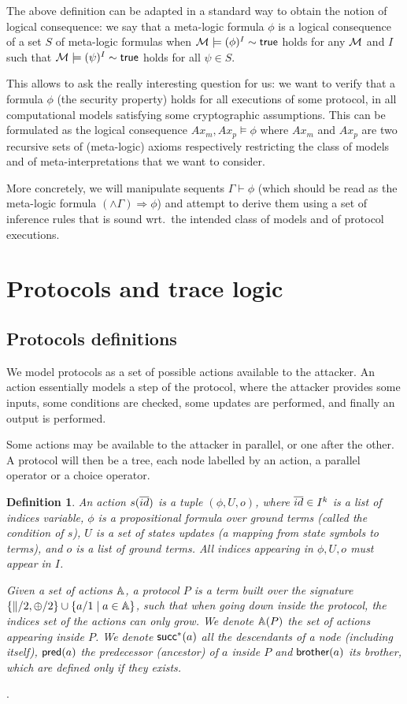 \documentclass[a4paper]{article}
\newtheorem{definition}{Definition}
\theoremstyle{remark}
\begin{document}
The above definition can be adapted in a standard way to obtain the
notion of logical consequence: we say that a meta-logic formula $\phi$ is a
logical consequence of a set $S$ of meta-logic formulas when
$\mathcal{M}\models(\phi)^I\sim\mathsf{true}$ holds for any $\mathcal{M}$ and $I$ such that
$\mathcal{M}\models(\psi)^I\sim\mathsf{true}$ holds for all $\psi\in S$.

This allows to ask the really interesting question for us:
we want to verify that a formula $\phi$ (the security property)
holds for all executions of some protocol, in all computational models
satisfying some cryptographic assumptions.
This can be formulated as the logical consequence $Ax_m,Ax_p\models\phi$
where $Ax_m$ and $Ax_p$ are two recursive sets of (meta-logic) axioms
respectively restricting the class of models and of meta-interpretations
that we want to consider.

More concretely, we will manipulate sequents $\Gamma \vdash \phi$
(which should be read as the meta-logic formula
$(\wedge\Gamma) \Rightarrow \phi$) and attempt to derive them using
a set of inference rules that is sound wrt.\ the intended class
of models and of protocol executions.

\section{Protocols and trace logic}

\subsection{Protocols definitions}
We  model protocols as a set of possible actions available to the
attacker. An action essentially models a step of the protocol, where
the attacker provides some inputs, some conditions are checked, some
updates are performed, and finally an output is performed.

Some actions may be available to the attacker in parallel, or one
after the other. A protocol will then be a tree, each node labelled by an action, a parallel operator or a choice operator.

\begin{definition}
An action $s(\overline{id})$ is a tuple $(\phi,U,o)$, where $\overline{id} \in I^k$ is a list of indices variable, $\phi$ is a propositional formula over ground terms (called the condition of $s$), $U$ is a set of states updates (a mapping from state symbols to terms), and $o$ is a list of ground terms.
All indices appearing in $\phi,U,o$ must appear in $I$.

Given a set of actions $\mathbb{A}$, a protocol $P$ is a term built over the signature $\{\|/2,\oplus/2\} \cup \{a/1 \mid a \in \mathbb{A}\}$, such that when going down inside the protocol, the indices set of the actions can only grow. We denote $\mathbb{A}(P)$ the set of actions appearing inside $P$. We denote $\textsf{succ}^*(a)$ all the descendants of a node (including itself), $\textsf{pred}(a)$ the predecessor (ancestor) of $a$ inside $P$ and $\textsf{brother}(a)$ its brother, which are defined only if they exists.
\end{definition}.
\end{document}
